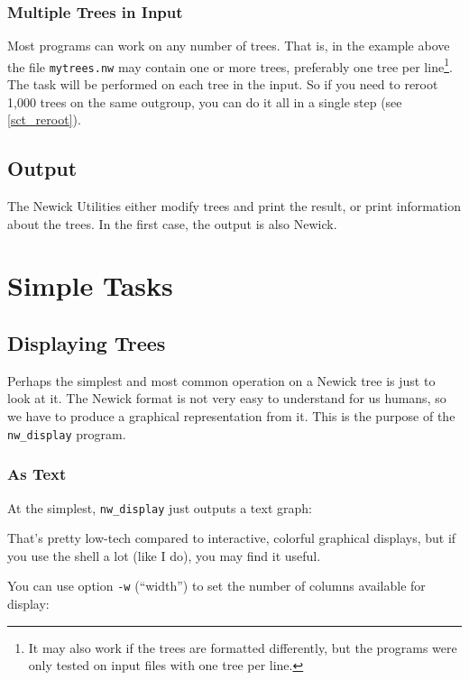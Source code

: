 \documentclass[a4paper,10pt]{report}
\newcommand{\nutils}{Newick Utilities}
\newcommand{\nw}{Newick}
\newcommand{\display}{\texttt{nw\_display}}
\begin{document}
\subsection{Multiple Trees in Input}

Most programs can work on any number of trees. That is, in the example above the file \texttt{mytrees.nw} may contain one or more trees, preferably one tree per line\footnote{It may also work if the trees are formatted differently, but the programs were only tested on input files with one tree per line.}. The task will be performed on each tree in the input. So if you need to reroot 1,000 trees on the same outgroup, you can do it all in a single step (see \ref{sct_reroot}).

\section{Output}
\label{sect_output}

The \nutils{} either modify trees and print the result, or print information about the trees. In the first case, the output is also Newick.

\chapter{Simple Tasks}
\label{chap_simple}

\section{Displaying Trees}
\label{sct_display}

Perhaps the simplest and most common operation on a \nw{} tree is just to look at it. The \nw{} format is not very easy to understand for us humans, so we have to produce a graphical representation from it. This is the purpose of the \display{} program. 

\subsection{As Text}
\label{sct_display_text}

At the simplest, \display{} just outputs a text graph:




That's pretty low-tech compared to interactive, colorful graphical displays, but if you use the shell a lot (like I do), you may find it useful.

You can use option \texttt{-w} (``width'') to set the number of columns available for display:
\end{document}
